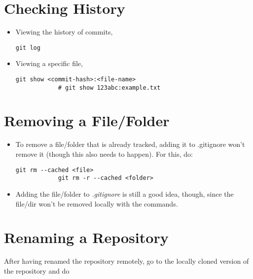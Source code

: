 \documentclass[12pt, a4paper]{scrbook}
\numberwithin{equation}{section}
\theoremstyle{definition}
\theoremstyle{definition}
\begin{document}
	\section{Checking History}

	\begin{itemize}
		\item Viewing the history of commits,
		
		\begin{lstlisting}[style=mystylebash, label=alg:history1, xleftmargin=\parindent]
			git log
		\end{lstlisting}
	
		\item Viewing a specific file,
		
		\begin{lstlisting}[style=mystylebash, label=alg:history1, xleftmargin=\parindent]
			git show <commit-hash>:<file-name>
			# git show 123abc:example.txt
		\end{lstlisting}
	
	\end{itemize}
	
	\section{Removing a File/Folder}
	
	\begin{itemize}
		\item To remove a file/folder that is already tracked, adding it to .gitignore won’t remove it (though this also needs to happen). For this, do:
		
		\begin{lstlisting}[style=mystylebash, label=alg:git_remove, xleftmargin=\parindent]
			git rm --cached <file>
			git rm -r --cached <folder>
		\end{lstlisting}

		\item Adding the file/folder to \textit{.gitignore} is still a good idea, though, since the file/dir won’t be removed locally with the commands.
	\end{itemize}
	
	\section{Renaming a Repository}

		After having renamed the repository remotely, go to the locally cloned version of the repository and do
		
\end{document}

